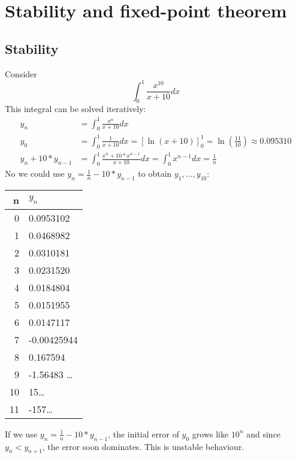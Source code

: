 \chapter{Stability and fixed-point theorem}\label{ch:stability-and-fixed-point-theorem}


\section{Stability}\label{sec:stability}
Consider
\begin{equation*}
    \int_0^1 \frac{x^{10} }{x+10} dx
\end{equation*}
This integral can be solved iteratively:
\begin{align*}
    y_n &= \int_0^1 \frac{x^n}{x+10} dx \\
    y_0 &= \int_0^1 \frac{1}{x+10} dx = \left[ \ln(x+10) \right]^1_0 = \ln\left( \frac{11}{10} \right) \approx 0.095310\\
    y_n + 10 * y_{n-1} &= \int_0^1 \frac{x^n+10*x^{n-1}}{x+10} dx = \int_0^1 x^{n-1} dx = \frac{1}{n}
\end{align*}
No we could use $y_n = \frac{1}{n}- 10 * y_{n-1}$ to obtain $y_1, \ldots{},  y_{10}$:
\begin{center}
    \begin{tabular}{r l}
        \toprule
        n  & $y_n$           \\
        \midrule
        0  & 0.0953102       \\
        1  & 0.0468982       \\
        2  & 0.0310181       \\
        3  & 0.0231520       \\
        4  & 0.0184804       \\
        5  & 0.0151955       \\
        6  & 0.0147117       \\
        7  & -0.00425944     \\
        8  & 0.167594        \\
        9  & -1.56483 \ldots \\
        10 & 15\ldots        \\
        11 & -157\ldots      \\
        \bottomrule
    \end{tabular}
\end{center}
If we use $y_n = \frac{1}{n}- 10 * y_{n-1}$, the initial error of $y_0$ grows like $10^n$ and since $y_n< y_{n+1}$, the error soon dominates. This is unstable behaviour.

